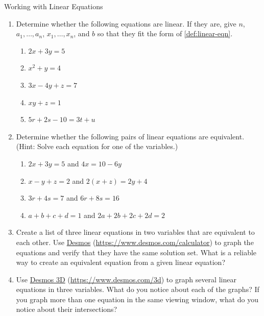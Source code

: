 \documentclass{article}
\begin{document}
\begin{activity}Working with Linear Equations

    \begin{enumerate}
        \item Determine whether the following equations are linear. If they are, give \(n\), \(a_1, \ldots, a_n\), \(x_1, \ldots, x_n\), and \(b\) so that they fit the form of \cref{def:linear-eqn}.
        \begin{enumerate}[label=(\alph*)]
            \item \(2x+3y=5\)
            \item \(x^2+y=4\)
            \item \(3x-4y+z=7\)
            \item \(xy+z=1\)
            \item \(5r+2s-10=3t+u\)
        \end{enumerate}
        \item Determine whether the following pairs of linear equations are equivalent. (Hint: Solve each equation for one of the variables.)
        \begin{enumerate}[label=(\alph*)]
            \item \(2x+3y=5\) and \(4x=10-6y\)
            \item \(x-y+z=2\) and \(2(x+z)=2y+4\)
            \item \(3r+4s=7\) and \(6r+8s=16\)
            \item \(a+b+c+d=1\) and \(2a+2b+2c+2d=2\)
        \end{enumerate}
        \item Create a list of three linear equations in two variables that are equivalent to each other. Use \href{https://www.desmos.com/calculator}{Desmos} (\url{https://www.desmos.com/calculator}) to graph the equations and verify that they have the same solution set. What is a reliable way to create an equivalent equation from a given linear equation?
        \item Use \href{https://www.desmos.com/3d}{Desmos 3D} (\url{https://www.desmos.com/3d}) to graph several linear equations in three variables. What do you notice about each of the graphs? If you graph more than one equation in the same viewing window, what do you notice about their intersections?
    \end{enumerate}
\end{activity}
\end{document}
